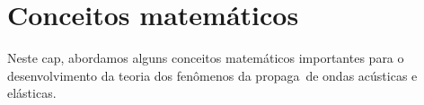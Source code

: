 
\chapter{Conceitos matem\'aticos}

Neste cap\itulo, abordamos alguns conceitos matem\'aticos importantes
para o desenvolvimento da teoria dos fen\^omenos da propaga\cao\ de
ondas ac\'usticas e el\'asticas.
